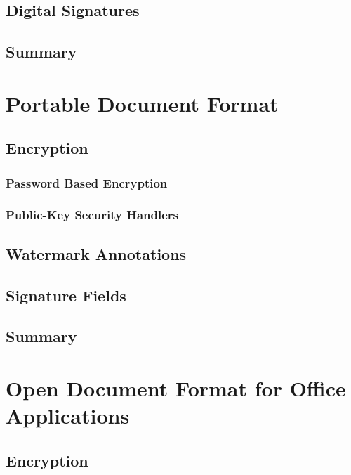\documentclass[11pt,oneside]{fithesis2}
\begin{document}
\section{Digital Signatures}\label{data_integrity}

\section{Summary}

\chapter{Portable Document Format}

\section{Encryption}

\subsection{Password Based Encryption} \label{pdf_enc}

\subsection{Public-Key Security Handlers}

\section{Watermark Annotations}

\section{Signature Fields}

\section{Summary}

\chapter{Open Document Format for Office Applications}

\section{Encryption} \label{odt_enc}
\end{document}
